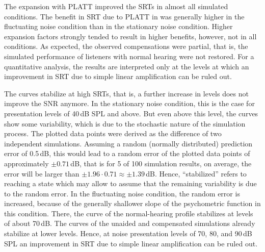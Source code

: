 \documentclass[10pt,a4paper,twocolumn]{article}
\begin{document}
The expansion with PLATT improved the SRTs in almost all simulated conditions.
%
The benefit in SRT due to PLATT in was generally higher in the fluctuating noise condition than in the stationary noise condition.
%
Higher expansion factors strongly tended to result in higher benefits, however, not in all conditions.
%
As expected, the observed compensations were partial, that is, the simulated performance of listeners with normal hearing were not restored.
%
For a quantitative analysis, the results are interpreted only at the levels at which an improvement in SRT due to simple linear amplification can be ruled out.

The curves stabilize at high SRTs, that is, a further increase in levels does not improve the SNR anymore.
%
In the stationary noise condition, this is the case for presentation levels of 40\,dB SPL and above.
%
But even above this level, the curves show some variability, which is due to the stochastic nature of the simulation process.
%
The plotted data points were derived as the difference of two independent simulations.
%
Assuming a random (normally distributed) prediction error of 0.5\,dB, this would lead to a random error of the plotted data points of approximately $\pm0.71$\,dB, that is for 5 of 100 simulation results, on average, the error will be larger than $\pm1.96\cdot0.71\approx\pm1.39$\,dB.
%
Hence, \enquote{stabilized} refers to reaching a state which may allow to assume that the remaining variability is due to the random error.
%
In the fluctuating noise condition, the random error is increased, because of the generally shallower slope of the psychometric function in this condition.
%
There, the curve of the normal-hearing profile stabilizes at levels of about 70\,dB.
%
The curves of the unaided and compensated simulations already stabilize at lower levels.
%
Hence, at noise presentation levels of 70, 80, and 90\,dB SPL an improvement in SRT due to simple linear amplification can be ruled out.
\end{document}
